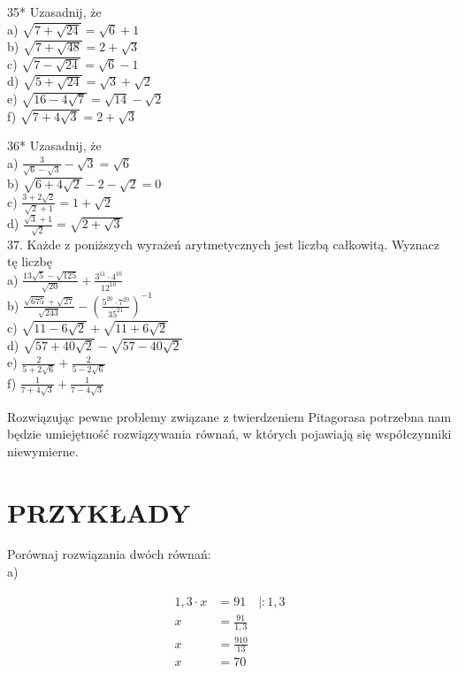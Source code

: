 \documentclass[10pt]{article}
\begin{document}
35* Uzasadnij, że\\
a) \(\sqrt{7+\sqrt{24}}=\sqrt{6}+1\)\\
b) \(\sqrt{7+\sqrt{48}}=2+\sqrt{3}\)\\
c) \(\sqrt{7-\sqrt{24}}=\sqrt{6}-1\)\\
d) \(\sqrt{5+\sqrt{24}}=\sqrt{3}+\sqrt{2}\)\\
e) \(\sqrt{16-4 \sqrt{7}}=\sqrt{14}-\sqrt{2}\)\\
f) \(\sqrt{7+4 \sqrt{3}}=2+\sqrt{3}\)

36* Uzasadnij, że\\
a) \(\frac{3}{\sqrt{6}-\sqrt{3}}-\sqrt{3}=\sqrt{6}\)\\
b) \(\sqrt{6+4 \sqrt{2}}-2-\sqrt{2}=0\)\\
c) \(\frac{3+2 \sqrt{2}}{\sqrt{2}+1}=1+\sqrt{2}\)\\
d) \(\frac{\sqrt{3}+1}{\sqrt{2}}=\sqrt{2+\sqrt{3}}\)\\
37. Każde z poniższych wyrażeń arytmetycznych jest liczbą całkowitą. Wyznacz tę liczbę\\
a) \(\frac{13 \sqrt{5}-\sqrt{125}}{\sqrt{20}}+\frac{3^{11} \cdot 4^{10}}{12^{10}}\)\\
b) \(\frac{\sqrt{675}+\sqrt{27}}{\sqrt{243}}-\left(\frac{5^{20} \cdot 7^{20}}{35^{21}}\right)^{-1}\)\\
c) \(\sqrt{11-6 \sqrt{2}}+\sqrt{11+6 \sqrt{2}}\)\\
d) \(\sqrt{57+40 \sqrt{2}}-\sqrt{57-40 \sqrt{2}}\)\\
e) \(\frac{2}{5+2 \sqrt{6}}+\frac{2}{5-2 \sqrt{6}}\)\\
f) \(\frac{1}{7+4 \sqrt{3}}+\frac{1}{7-4 \sqrt{3}}\)

Rozwiązując pewne problemy związane z twierdzeniem Pitagorasa potrzebna nam będzie umiejętność rozwiązywania równań, w których pojawiają się współczynniki niewymierne.

\section*{PRZYKŁADY}
Porównaj rozwiązania dwóch równań:\\
a)

\[
\begin{aligned}
1,3 \cdot x & =91 \quad \mid: 1,3 \\
x & =\frac{91}{1,3} \\
x & =\frac{910}{13} \\
x & =70
\end{aligned}
\]
\end{document}
